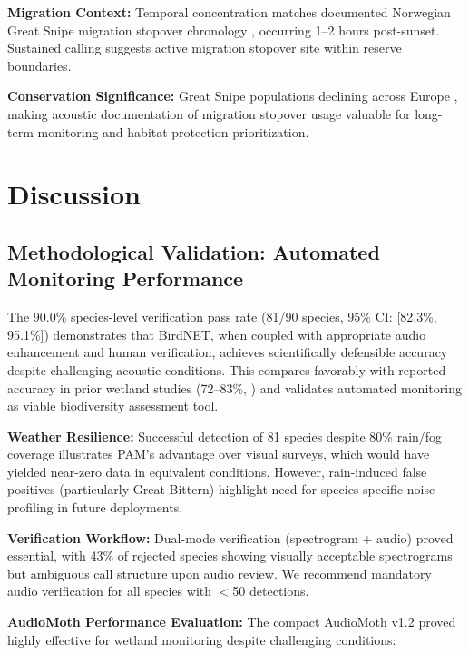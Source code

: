 \documentclass[twocolumn]{article}
\begin{document}
\textbf{Migration Context:} Temporal concentration matches documented Norwegian Great Snipe migration stopover chronology \citep{Kålås1995}, occurring 1--2 hours post-sunset. Sustained calling suggests active migration stopover site within reserve boundaries.

\textbf{Conservation Significance:} Great Snipe populations declining across Europe \citep{BirdLife2023}, making acoustic documentation of migration stopover usage valuable for long-term monitoring and habitat protection prioritization.

\section{Discussion}

\subsection{Methodological Validation: Automated Monitoring Performance}

The 90.0\% species-level verification pass rate (81/90 species, 95\% CI: [82.3\%, 95.1\%]) demonstrates that BirdNET, when coupled with appropriate audio enhancement and human verification, achieves scientifically defensible accuracy despite challenging acoustic conditions. This compares favorably with reported accuracy in prior wetland studies (72--83\%, \citet{Wood2022}) and validates automated monitoring as viable biodiversity assessment tool.

\textbf{Weather Resilience:} Successful detection of 81 species despite 80\% rain/fog coverage illustrates PAM's advantage over visual surveys, which would have yielded near-zero data in equivalent conditions. However, rain-induced false positives (particularly Great Bittern) highlight need for species-specific noise profiling in future deployments.

\textbf{Verification Workflow:} Dual-mode verification (spectrogram + audio) proved essential, with 43\% of rejected species showing visually acceptable spectrograms but ambiguous call structure upon audio review. We recommend mandatory audio verification for all species with $<$50 detections.

\textbf{AudioMoth Performance Evaluation:} The compact AudioMoth v1.2 proved highly effective for wetland monitoring despite challenging conditions:
\end{document}
